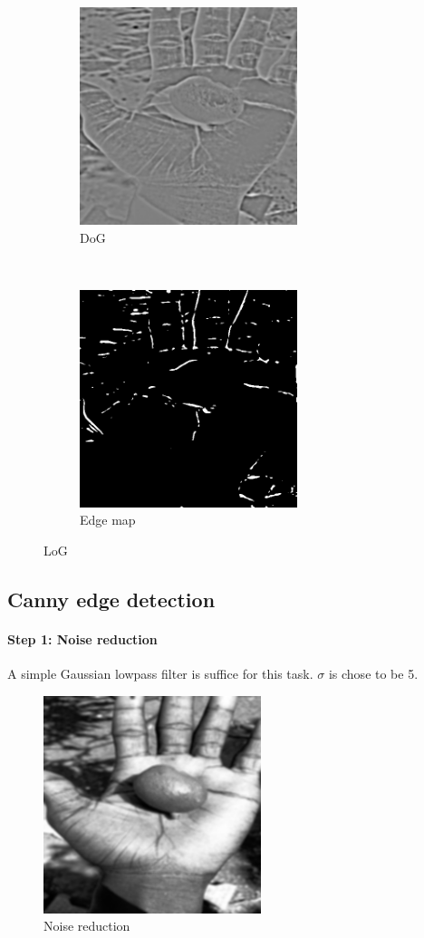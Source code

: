 \documentclass[12pt]{article}
\begin{document}
\begin{figure}[H]
    \centering
    \begin{subfigure}[t]{0.5\textwidth}
        \centering
        \includegraphics[height=2.5in]{images/dog_grad}
        \caption{DoG}
    \end{subfigure}%
    ~
    \begin{subfigure}[t]{0.5\textwidth}
        \centering
        \includegraphics[height=2.5in]{images/dog_edge}
        \caption{Edge map}
    \end{subfigure}
    \caption{LoG}
    \label{fig:dog}
\end{figure}

\subsection*{Canny edge detection}
\paragraph*{Step 1: Noise reduction}
A simple Gaussian lowpass filter is suffice for this task. $\sigma$ is chose to be 5.
\begin{figure}[H]
    \centering
    \includegraphics[height=2.5in]{images/canny_1}
    \caption{Noise reduction}
\end{figure}
\end{document}

